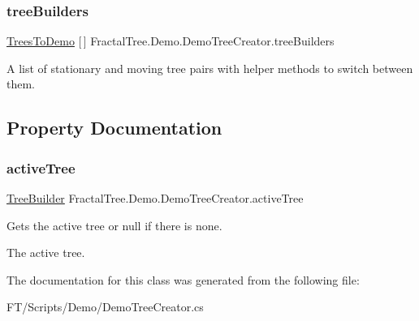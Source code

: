 \subsubsection{\texorpdfstring{tree\+Builders}{treeBuilders}}
{\footnotesize\ttfamily \hyperlink{class_fractal_tree_1_1_demo_1_1_trees_to_demo}{Trees\+To\+Demo} \mbox{[}$\,$\mbox{]} Fractal\+Tree.\+Demo.\+Demo\+Tree\+Creator.\+tree\+Builders}



A list of stationary and moving tree pairs with helper methods to switch between them. 



\subsection{Property Documentation}
\mbox{\label{class_fractal_tree_1_1_demo_1_1_demo_tree_creator_a67e1b37c9ecc60e628533b069c3c0d98}} 
\subsubsection{\texorpdfstring{active\+Tree}{activeTree}}
{\footnotesize\ttfamily \hyperlink{class_fractal_tree_1_1_tree_builder}{Tree\+Builder} Fractal\+Tree.\+Demo.\+Demo\+Tree\+Creator.\+active\+Tree\hspace{0.3cm}{\ttfamily [get]}}



Gets the active tree or null if there is none. 

The active tree.

The documentation for this class was generated from the following file\+:\begin{DoxyCompactItemize}
\item 
F\+T/\+Scripts/\+Demo/Demo\+Tree\+Creator.\+cs\end{DoxyCompactItemize}
